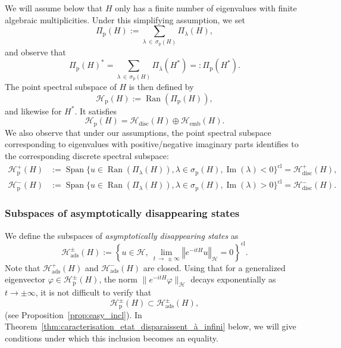 \documentclass[10pt]{amsart}
\theoremstyle{definition}\newtheorem{defi}[theo]{Definition}\newtheorem{rema}[theo]{Remark}\newtheorem{exam}[theo]{Example}\newtheorem{exem}[theo]{Example}\newtheorem{nota}[theo]{Notation}
\newcommand{\Hi}{\mathcal{H}}
\newcommand{\rmp}{\mathrm{p}}
\newcommand{\ads}{\mathrm{ads}}
\newcommand{\disc}{\mathrm{disc}}
\newcommand{\norme}[1]{\left\Vert #1\right\Vert}
\DeclareMathOperator{\Ran}{Ran}
\DeclareMathOperator{\Span}{Span}
\DeclareMathOperator{\im}{Im}
\begin{document}
We will assume below that $H$ only has a finite number of eigenvalues with finite algebraic multiplicities. Under this simplifying assumption, we set
\begin{equation*}
\Pi_\rmp(H):=\sum_{\lambda\,\in\,\sigma_{\rmp}(H)} \Pi_\lambda(H),
\end{equation*}
and observe that
\begin{equation*}
\Pi_\rmp(H)^*=\sum_{\lambda\,\in\,\sigma_{\rmp}(H)} \Pi_{\overline{\lambda}}(H^*)=:\Pi_\rmp(H^*).
\end{equation*}
The point spectral subspace of $H$ is then defined by
\begin{equation*}
\Hi_{\rmp}(H):=\Ran(\Pi_{\rmp}(H)),
\end{equation*}
and likewise for $H^*$. It satisfies
\begin{equation*}
\Hi_{\rmp}(H)=\Hi_{\disc}(H)\oplus\Hi_{\mathrm{emb}}(H).
\end{equation*}
We also observe that under our assumptions, the point spectral subspace corresponding to eigenvalues with positive/negative imaginary parts identifies to the corresponding discrete spectral subspace:
\begin{align}
\Hi_\rmp^+(H)&:=\Span\big\lbrace u\in\Ran\left(\Pi_\lambda(H)\right),\lambda\in\sigma_\rmp(H),\im(\lambda)<0\big\rbrace^{\mathrm{cl}}=\Hi_\disc^+(H),\\
\Hi_\rmp^-(H)&:=\Span\big\lbrace u\in\Ran\left(\Pi_\lambda(H)\right),\lambda\in\sigma_\rmp(H),\im(\lambda)>0\big\rbrace^{\mathrm{cl}}=\Hi_\disc^-(H).
\end{align}

\subsubsection{Subspaces of asymptotically disappearing states}

We define the subspaces of \emph{asymptotically disappearing states} as
\begin{equation*}
\Hi_\ads^\pm(H):=\left\lbrace u\in\Hi,~\lim_{t\,\rightarrow\,\pm\infty}\norme{e^{-itH}u}_\Hi=0\right\rbrace^{\mathrm{cl}}.
\end{equation*}
Note that $\Hi^+_\ads(H)$ and $\Hi^-_\ads(H)$ are closed. Using that for a generalized eigenvector $\varphi \in \Hi^\pm_\rmp(H)$, the norm $\|e^{-itH}\varphi\|_\Hi$ decays exponentially as $t\to\pm\infty$, it is not difficult to verify that
\begin{equation*}
\Hi_\rmp^\pm(H) \subset \Hi_\ads^\pm(H),
\end{equation*}
(see Proposition~\ref{prop:easy_incl}). In Theorem~\ref{thm:caracterisation_etat_disparaissent_à_infini} below, we will give conditions under which this inclusion becomes an equality.
\end{document}

